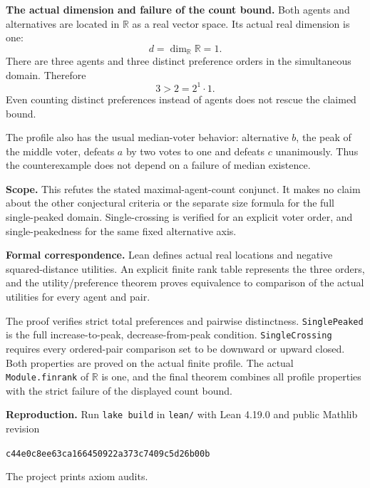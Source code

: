 \documentclass[11pt]{article}
\begin{document}
\textbf{The actual dimension and failure of the count bound.}
Both agents and alternatives are located in $\mathbb R$ as a
real vector space. Its actual real dimension is one:
\[
 d=\dim_{\mathbb R}\mathbb R=1.
\]
There are three agents and three distinct preference orders in
the simultaneous domain. Therefore
\[
 3>2=2^1\cdot1.
\]
Even counting distinct preferences instead of agents does not
rescue the claimed bound.

The profile also has the usual median-voter behavior: alternative
$b$, the peak of the middle voter, defeats $a$ by two votes to one
and defeats $c$ unanimously. Thus the counterexample does not
depend on a failure of median existence.

\textbf{Scope.}
This refutes the stated maximal-agent-count conjunct.
It makes no claim about the other conjectural criteria or the
separate size formula for the full single-peaked domain.
Single-crossing is verified for an explicit voter order, and
single-peakedness for the same fixed alternative axis.

\textbf{Formal correspondence.}
Lean defines actual real locations and negative squared-distance
utilities. An explicit finite rank table represents the three
orders, and the utility/preference theorem proves equivalence
to comparison of the actual utilities for every agent and pair.

The proof verifies strict total preferences and pairwise
distinctness. \texttt{SinglePeaked} is the full increase-to-peak,
decrease-from-peak condition. \texttt{SingleCrossing} requires
every ordered-pair comparison set to be downward or upward closed.
Both properties are proved on the actual finite profile.
The actual \texttt{Module.finrank} of $\mathbb R$ is one,
and the final theorem combines all profile properties with
the strict failure of the displayed count bound.

\textbf{Reproduction.}
Run \texttt{lake build} in \texttt{lean/} with Lean 4.19.0 and
public Mathlib revision
\begin{center}\small\texttt{c44e0c8ee63ca166450922a373c7409c5d26b00b}\end{center}
The project prints axiom audits.
\end{document}

